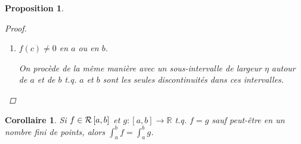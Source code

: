 \documentclass{report}
\newcommand*{\dint}[3]{\displaystyle\int_{#1}^{#2}#3}
\newcommand*{\eps}{\varepsilon}
\newcommand*{\lte}{\leqslant}
\newcommand*{\gte}{\geqslant}
\newcommand*{\reels}{\mathbb{R}}
\newtheorem*{prop}{Proposition}
\newtheorem*{coro}{Corollaire}
\theoremstyle{definition}
\theoremstyle{remark}
\begin{document}
\begin{prop}
\begin{proof}
\begin{enumerate}[label=\alph*)]
\begin{enumerate}[label=\arabic*)]
					On a
					\begin{align*}
						\begin{split}
							\ssup{f}&= \ssup{f}[\Delta_1] + 2\eta \msup{f}[c-\eta,c+\eta] + \ssup{f}[\Delta_2]\\
							&\lte \ssup{f}[\Delta_1] + 2\eta \msup{f} + \ssup{f}[\Delta_2]\\
							&< \dfrac{\eps}{4} + \dfrac{\eps}{2} + \dfrac{\eps}{4}\\
							&= \eps
						\end{split}
					\end{align*}

					De m\^eme, $\sinf{f}[\Delta_i] \lte \ssup{f}[\Delta_i] < \dfrac{\eps}{4}$, pour $i\in\{1,2\}$.

					et
					\begin{align*}
						\sinf{f}&= \sinf{f}[\Delta_1] + 2\eta \minf{f}[c-\eta,c+\eta] + \sinf{f}[\Delta_2]\\
						&\gte \sinf{f}[\Delta_1] + 2\eta \minf{f} + \sinf{f}[\Delta_2]\\
						&> -\dfrac{\eps}{4} - \dfrac{\eps}{2} - \dfrac{\eps}{4}\\
						&= -\eps
					\end{align*}

					Donc, $-\eps < \sinf{f} \lte \ssup{f} < \eps$.

					Comme $\eps>0$ est arbirtaire, on en d\'eduit que $\dint{a}{b}{f}=0$.
					\item $f(c)\neq0$ en $a$ ou en $b$.

					On proc\`ede de la m\^eme mani\`ere avec un sous-intervalle de largeur $\eta$ autour de $a$ et de $b$ t.q. $a$ et $b$ sont les seules discontinuit\'es dans ces intervalles.
				\end{enumerate}
			\end{enumerate}
		\end{proof}
	\end{prop}
	\begin{coro}
		Si $f \in \riemann$ et $g:[a,b] \to \reels$ t.q. $f=g$ sauf peut-\^etre en un nombre fini de points, alors $\dint{a}{b}{f} = \int_{a}^{b}g$.
	\end{coro}

\newpage
\end{document}
